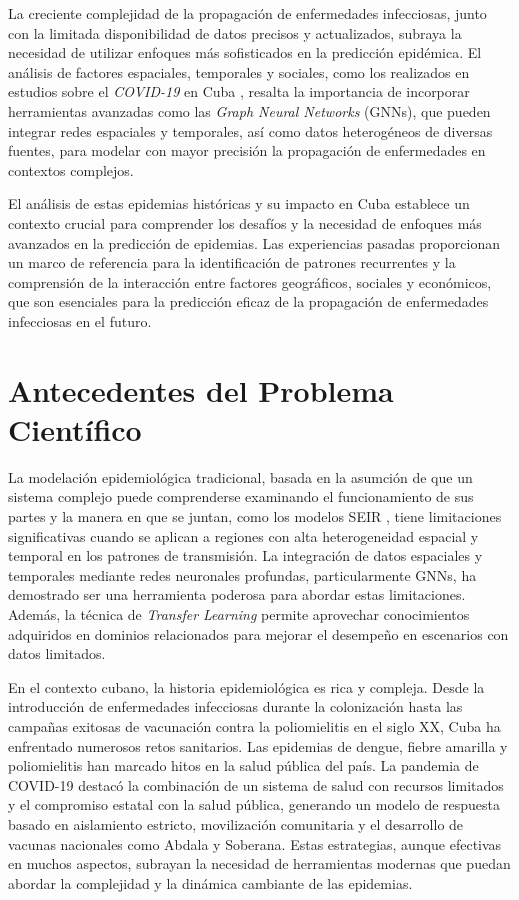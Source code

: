 La creciente complejidad de la propagación de enfermedades infecciosas, junto con la limitada disponibilidad de datos precisos y actualizados, subraya la necesidad de utilizar enfoques más sofisticados en la predicción epidémica. El análisis de factores espaciales, temporales y sociales, como los realizados en estudios sobre el \textit{COVID-19} en Cuba \textcite{Matamoros2020EntradaDV, mas2020covid}, resalta la importancia de incorporar herramientas avanzadas como las \textit{Graph Neural Networks} (GNNs), que pueden integrar redes espaciales y temporales, así como datos heterogéneos de diversas fuentes, para modelar con mayor precisión la propagación de enfermedades en contextos complejos.

El análisis de estas epidemias históricas y su impacto en Cuba establece un contexto crucial para comprender los desafíos y la necesidad de enfoques más avanzados en la predicción de epidemias. Las experiencias pasadas proporcionan un marco de referencia para la identificación de patrones recurrentes y la comprensión de la interacción entre factores geográficos, sociales y económicos, que son esenciales para la predicción eficaz de la propagación de enfermedades infecciosas en el futuro.

\section*{Antecedentes del Problema Científico}
La modelación epidemiológica tradicional, basada en la asumción de que un sistema complejo puede comprenderse examinando el funcionamiento de sus partes y la manera en que se juntan, como los modelos SEIR \parencite{Burke2024OriginsSEIR}, tiene limitaciones significativas cuando se aplican a regiones con alta heterogeneidad espacial y temporal en los patrones de transmisión. La integración de datos espaciales y temporales mediante redes neuronales profundas, particularmente GNNs, ha demostrado ser una herramienta poderosa para abordar estas limitaciones. Además, la técnica de \textit{Transfer Learning} permite aprovechar conocimientos adquiridos en dominios relacionados para mejorar el desempeño en escenarios con datos limitados.

En el contexto cubano, la historia epidemiológica es rica y compleja. Desde la introducción de enfermedades infecciosas durante la colonización hasta las campañas exitosas de vacunación contra la poliomielitis en el siglo XX, Cuba ha enfrentado numerosos retos sanitarios. Las epidemias de dengue, fiebre amarilla y poliomielitis han marcado hitos en la salud pública del país. La pandemia de COVID-19 destacó la combinación de un sistema de salud con recursos limitados y el compromiso estatal con la salud pública, generando un modelo de respuesta basado en aislamiento estricto, movilización comunitaria y el desarrollo de vacunas nacionales como Abdala y Soberana. Estas estrategias, aunque efectivas en muchos aspectos, subrayan la necesidad de herramientas modernas que puedan abordar la complejidad y la dinámica cambiante de las epidemias.

